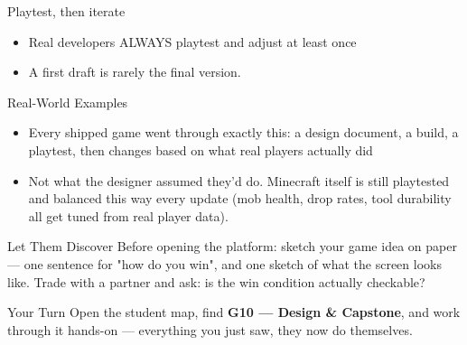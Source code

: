 \documentclass[aspectratio=169]{beamer}
\begin{document}
\begin{frame}{Playtest, then iterate}
    \large
    \begin{itemize}
        \item Real developers ALWAYS playtest and adjust at least once
        \item A first draft is rarely the final version.
    \end{itemize}
\end{frame}

\begin{frame}{Real-World Examples}
    \large
    \begin{itemize}
        \item Every shipped game went through exactly this: a design document, a build, a playtest, then changes based on what real players actually did
        \item Not what the designer assumed they'd do. Minecraft itself is still playtested and balanced this way every update (mob health, drop rates, tool durability all get tuned from real player data).
    \end{itemize}
\end{frame}


\begin{frame}{Let Them Discover}
    \Large
    Before opening the platform: sketch your game idea on paper — one sentence for "how do you win", and one sketch of what the screen looks like. Trade with a partner and ask: is the win condition actually checkable?
\end{frame}

\begin{frame}{Your Turn}
    \Large
    Open the student map, find \textbf{G10 — Design \& Capstone}, and work through it
    hands-on --- everything you just saw, they now do themselves.
\end{frame}
\end{document}
